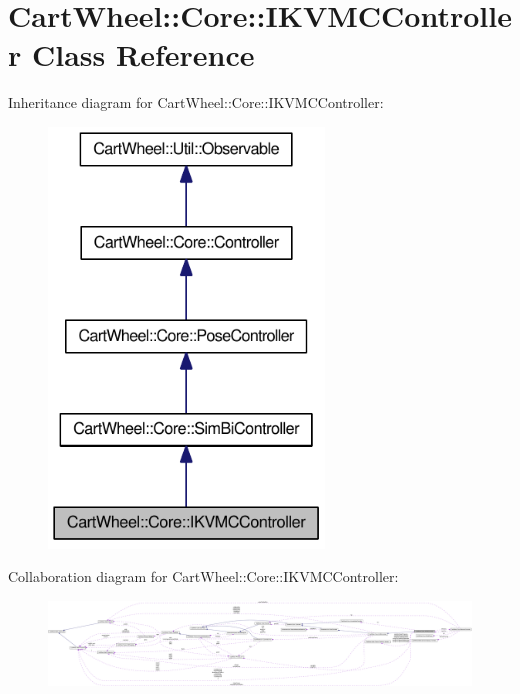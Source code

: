 \hypertarget{classCartWheel_1_1Core_1_1IKVMCController}{
\section{CartWheel::Core::IKVMCController Class Reference}
\label{classCartWheel_1_1Core_1_1IKVMCController}
}


Inheritance diagram for CartWheel::Core::IKVMCController:\nopagebreak
\begin{figure}[H]
\begin{center}
\leavevmode
\includegraphics[width=208pt]{classCartWheel_1_1Core_1_1IKVMCController__inherit__graph}
\end{center}
\end{figure}


Collaboration diagram for CartWheel::Core::IKVMCController:\nopagebreak
\begin{figure}[H]
\begin{center}
\leavevmode
\includegraphics[width=400pt]{classCartWheel_1_1Core_1_1IKVMCController__coll__graph}
\end{center}
\end{figure}
